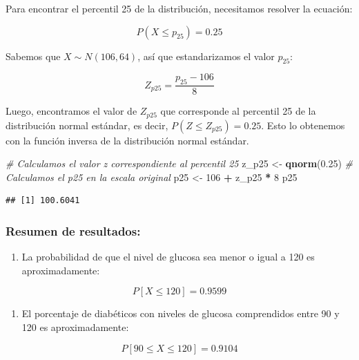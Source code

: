 \documentclass[
]{article}
\newenvironment{Shaded}{\begin{snugshade}}{\end{snugshade}}
\newcommand{\CommentTok}[1]{\textcolor[rgb]{0.56,0.35,0.01}{\textit{#1}}}
\newcommand{\DecValTok}[1]{\textcolor[rgb]{0.00,0.00,0.81}{#1}}
\newcommand{\FloatTok}[1]{\textcolor[rgb]{0.00,0.00,0.81}{#1}}
\newcommand{\FunctionTok}[1]{\textcolor[rgb]{0.13,0.29,0.53}{\textbf{#1}}}
\newcommand{\NormalTok}[1]{#1}
\newcommand{\OtherTok}[1]{\textcolor[rgb]{0.56,0.35,0.01}{#1}}
\newcommand{\SpecialCharTok}[1]{\textcolor[rgb]{0.81,0.36,0.00}{\textbf{#1}}}
\providecommand{\tightlist}{%
  \setlength{\itemsep}{0pt}\setlength{\parskip}{0pt}}
\begin{document}
Para encontrar el percentil 25 de la distribución, necesitamos resolver la ecuación:

\[ P(X \leq p_{25}) = 0.25 \]

Sabemos que \(X \sim N(106, 64)\), así que estandarizamos el valor \(p_{25}\):

\[ Z_{p25} = \frac{p_{25} - 106}{8} \]

Luego, encontramos el valor de \(Z_{p25}\) que corresponde al percentil 25 de la distribución normal estándar, es decir, \(P(Z \leq Z_{p25}) = 0.25\). Esto lo obtenemos con la función inversa de la distribución normal estándar.

\begin{Shaded}
\begin{Highlighting}[]
\CommentTok{\# Calculamos el valor z correspondiente al percentil 25}
\NormalTok{z\_p25 }\OtherTok{\textless{}{-}} \FunctionTok{qnorm}\NormalTok{(}\FloatTok{0.25}\NormalTok{)}
\CommentTok{\# Calculamos el p25 en la escala original}
\NormalTok{p25 }\OtherTok{\textless{}{-}} \DecValTok{106} \SpecialCharTok{+}\NormalTok{ z\_p25 }\SpecialCharTok{*} \DecValTok{8}
\NormalTok{p25}
\end{Highlighting}
\end{Shaded}

\begin{verbatim}
## [1] 100.6041
\end{verbatim}

\subsubsection{Resumen de resultados:}\label{resumen-de-resultados}

\begin{enumerate}
\def\labelenumi{\arabic{enumi}.}
\tightlist
\item
  La probabilidad de que el nivel de glucosa sea menor o igual a 120 es aproximadamente:
\end{enumerate}

\[ P[X \leq 120] = 0.9599 \]

\begin{enumerate}
\def\labelenumi{\arabic{enumi}.}
\setcounter{enumi}{1}
\tightlist
\item
  El porcentaje de diabéticos con niveles de glucosa comprendidos entre 90 y 120 es aproximadamente:
\end{enumerate}

\[ P[90 \leq X \leq 120] = 0.9104 \]
\end{document}
